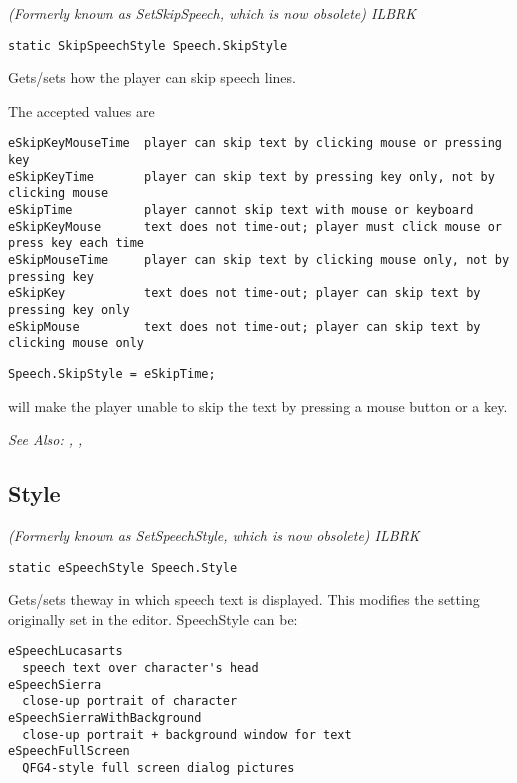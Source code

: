 \it{(Formerly known as SetSkipSpeech, which is now obsolete)} ILBRK

\begin{verbatim}
static SkipSpeechStyle Speech.SkipStyle
\end{verbatim}

Gets/sets how the player can skip speech lines.

The accepted values are
\begin{verbatim}
eSkipKeyMouseTime  player can skip text by clicking mouse or pressing key
eSkipKeyTime       player can skip text by pressing key only, not by clicking mouse
eSkipTime          player cannot skip text with mouse or keyboard
eSkipKeyMouse      text does not time-out; player must click mouse or press key each time
eSkipMouseTime     player can skip text by clicking mouse only, not by pressing key
eSkipKey           text does not time-out; player can skip text by pressing key only
eSkipMouse         text does not time-out; player can skip text by clicking mouse only
\end{verbatim}

\begin{verbatim}
Speech.SkipStyle = eSkipTime;
\end{verbatim}
will make the player unable to skip the text by pressing a mouse button or a key.

\it{See Also:} ,
,


\subsection{Style}\label{Speech.Style}%

\it{(Formerly known as SetSpeechStyle, which is now obsolete)} ILBRK

\begin{verbatim}
static eSpeechStyle Speech.Style
\end{verbatim}

Gets/sets theway in which speech text is displayed. This modifies the setting
originally set in the editor. SpeechStyle can be:
\begin{verbatim}
eSpeechLucasarts
  speech text over character's head
eSpeechSierra
  close-up portrait of character
eSpeechSierraWithBackground
  close-up portrait + background window for text
eSpeechFullScreen
  QFG4-style full screen dialog pictures
\end{verbatim}

